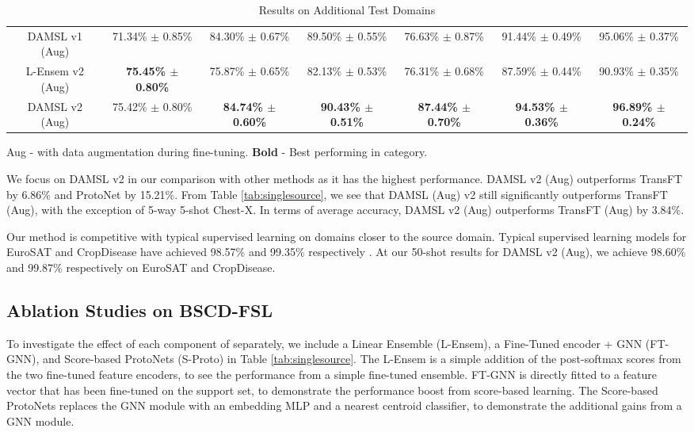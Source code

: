 \documentclass[final]{cvpr}
\begin{document}
\begin{table*}[t]
{{\begin{tabular}{ccccccc}
DAMSL v1 (Aug) & 71.34\% \(\pm\) 0.85\% & 84.30\% \(\pm\) 0.67\% & 89.50\% \(\pm\) 0.55\% & 76.63\% \(\pm\) 0.87\% & 91.44\% \(\pm\) 0.49\% & 95.06\% \(\pm\) 0.37\%  \\
L-Ensem v2 (Aug) & \textbf{75.45\% \(\pm\) 0.80\%} & 75.87\% \(\pm\) 0.65\% & 82.13\% \(\pm\) 0.53\% & 76.31\% \(\pm\) 0.68\% & 87.59\% \(\pm\) 0.44\% & 90.93\% \(\pm\) 0.35\%  \\
DAMSL v2 (Aug) & 75.42\% \(\pm\) 0.80\% & \textbf{84.74\% \(\pm\) 0.60\%} & \textbf{90.43\% \(\pm\) 0.51\%} & \textbf{87.44\% \(\pm\) 0.70\%} & \textbf{94.53\% \(\pm\) 0.36\%} & \textbf{96.89\% \(\pm\) 0.24\%}  \\
\bottomrule
\end{tabular}}}
\begin{footnotesize}
 Aug - with data augmentation during fine-tuning. \textbf{Bold} - Best performing in category. 
\end{footnotesize} 
\vskip 1mm
\caption{Results on Additional Test Domains}
\label{tab:other}\end{table*}

We focus on DAMSL v2 in our comparison with other methods as it has the highest performance. DAMSL v2 (Aug) outperforms TransFT by 6.86\% and ProtoNet by 15.21\%. From Table \ref{tab:singlesource}, we see that DAMSL (Aug) v2 still significantly outperforms TransFT (Aug), with the exception of 5-way 5-shot Chest-X. In terms of average accuracy, DAMSL v2 (Aug) outperforms TransFT (Aug) by 3.84\%.

Our method is competitive with typical supervised learning on domains closer to the source domain. Typical supervised learning models for EuroSAT and CropDisease have achieved 98.57\% and 99.35\% respectively \cite{helber2019eurosat} \cite{mohanty2016using}. At our 50-shot results for DAMSL v2 (Aug), we achieve 98.60\% and 99.87\% respectively on EuroSAT and CropDisease. 

\subsection{Ablation Studies on BSCD-FSL}
To investigate the effect of each component of separately, we include a Linear Ensemble (L-Ensem), a Fine-Tuned encoder + GNN (FT-GNN), and Score-based ProtoNets (S-Proto) in Table \ref{tab:singlesource}. The L-Ensem is a simple addition of the post-softmax scores from the two fine-tuned feature encoders, to see the performance from a simple fine-tuned ensemble. FT-GNN is directly fitted to a feature vector that has been fine-tuned on the support set, to demonstrate the performance boost from score-based learning. The Score-based ProtoNets replaces the GNN module with an embedding MLP and a nearest centroid classifier, to demonstrate the additional gains from a GNN module.
\end{document}
